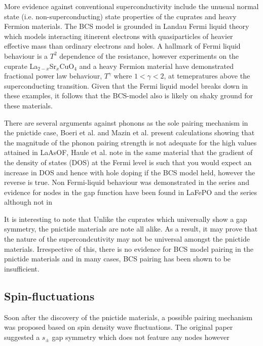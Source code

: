 More evidence against conventional superconductivity include the unusual normal state (i.e. non-superconducting) state properties of the cuprates and heavy Fermion materials. The BCS model is grounded in Landau Fermi liquid theory which models interacting itinerent electrons with quasiparticles of heavier effective mass than ordinary electrons and holes. A hallmark of Fermi liquid behaviour is a $T^2$ dependence of the resistance, however experiments on the cuprate La$_{2-x}$Sr$_{x}$CuO$_4$\cite{Cooper2009} and a heavy Fermion material\cite{Custers2003} have demonstrated fractional power law behaviour, $T^\gamma$ where $1 < \gamma < 2$, at temepratures above the superconducting transition. Given that the Fermi liquid model breaks down in these examples, it follows that the BCS-model also is likely on shaky ground for these materials.

There are several arguments against phonons as the sole pairing mechanism in the pnictide case, Boeri et al.\cite{Boeri2008} and Mazin et al.\cite{Mazin2008} present calculations showing that the magnitude of the phonon pairing strength is not adequate for the high \Tc values attained in LaAsOF, Haule et al.\cite{Haule2008} note in the same material that the gradient of the density of states (DOS) at the Fermi level is such that you would expect an increase in DOS and hence \Tc with hole doping if the BCS model held, however the reverse is true. Non Fermi-liquid behaviour was demonstrated in the \BaFePAs series\cite{Jiang2009,Kasahara2010} and evidence for nodes in the gap function have been found in LaFePO\cite{Fletcher2009} and the \BaFePAs series\cite{Zhang2011,Yamashita2011a,Suzuki2011} although not in 

It is interesting to note that Unlike the cuprates which universally show a \DxTwoyTwo gap symmetry, the pnictide materials are note all alike. As a result, it may prove that the nature of the supercondcutivity may not be universal amongst the pnictide materials. Irrespective of this, there is no evidence for BCS model pairing in the pnictide materials and in many cases, BCS pairing has been shown to be insufficient.


\subsection{Spin-fluctuations}

Soon after the discovery of the pnictide materials, a possible pairing mechanism was proposed based on spin density wave fluctuations. The original paper suggested a $s_{\pm}$ gap symmetry which does not feature any nodes however 

